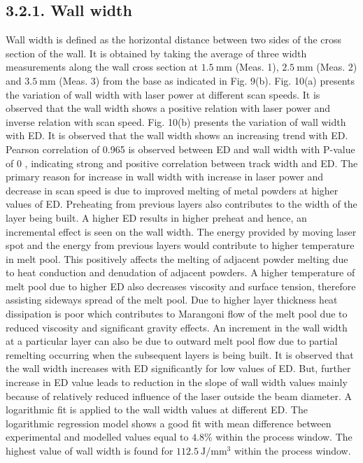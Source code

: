 \documentclass[10pt]{article}
\begin{document}
\subsection*{3.2.1. Wall width}
Wall width is defined as the horizontal distance between two sides of the cross section of the wall. It is obtained by taking the average of three width measurements along the wall cross section at $1.5 \mathrm{~mm}$ (Meas. 1), $2.5 \mathrm{~mm}$ (Meas. 2) and $3.5 \mathrm{~mm}$ (Meas. 3) from the base as indicated in Fig. 9(b). Fig. 10(a) presents the variation of wall width with laser power at different scan speeds. It is observed that the wall width shows a positive relation with laser power and inverse relation with scan speed. Fig. 10(b) presents the variation of wall width with ED. It is observed that the wall width shows an increasing trend with ED. Pearson correlation of 0.965 is observed between ED and wall width with $\mathrm{P}$-value of 0 , indicating strong and positive correlation between track width and ED. The primary reason for increase in wall width with increase in laser power and decrease in scan speed is due to improved melting of metal powders at higher values of ED. Preheating from previous layers also contributes to the width of the layer being built. A higher ED results in higher preheat and hence, an incremental effect is seen on the wall width. The energy provided by moving laser spot and the energy from previous layers would contribute to higher temperature in melt pool. This positively affects the melting of adjacent powder melting due to heat conduction and denudation of adjacent powders. A higher temperature of melt pool due to higher ED also decreases viscosity and surface tension, therefore assisting sideways spread of the melt pool. Due to higher layer thickness heat dissipation is poor which contributes to Marangoni flow of the melt pool due to reduced viscosity and significant gravity effects. An increment in the wall width at a particular layer can also be due to outward melt pool flow due to partial remelting occurring when the subsequent layers is being built. It is observed that the wall width increases with ED significantly for low values of ED. But, further increase in ED value leads to reduction in the slope of wall width values mainly because of relatively reduced influence of the laser outside the beam diameter. A logarithmic fit is applied to the wall width values at different ED. The logarithmic regression model shows a good fit with mean difference between experimental and modelled values equal to $4.8 \%$ within the process window. The highest value of wall width is found for $112.5 \mathrm{~J} / \mathrm{mm}^{3}$ within the process window.
\end{document}
